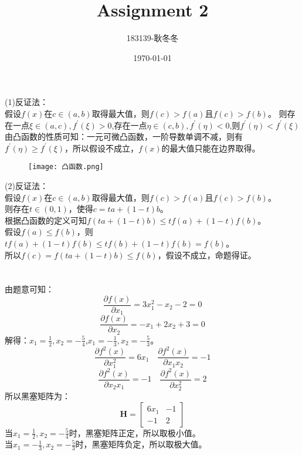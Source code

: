 \documentclass[12pt]{article}
\begin{document}
\title{Assignment 2}
\author{183139-耿冬冬}
\date{\today}
\maketitle

\section{}
\noindent
(1)反证法：\\
假设$f(x)$在$c \in (a,b)$取得最大值，则$f(c)>f(a)$且$f(c)>f(b)$。
则存在一点$\xi \in(a,c),f^{'}(\xi)>0$,存在一点$\eta \in(c,b),f^{'}(\eta)<0$,则$f^{'}(\eta) < f^{'}(\xi)$\\
由凸函数的性质可知：一元可微凸函数，一阶导数单调不减，则有$f^{'}(\eta) \geq f^{'}(\xi)$，所以假设不成立，$f(x)$的最大值只能在边界取得。\\
\begin{figure}
    \centering
    \texttt{[image: 凸函数.png]}
\end{figure}
(2)反证法：\\
假设$f(x)$在$c \in (a,b)$取得最大值，则$f(c)>f(a)$且$f(c)>f(b)$。\\
则存在$t \in(0,1)$，使得$c=ta+(1-t)b$。\\根据凸函数的定义可知$f(ta+(1-t)b)\leq tf(a)+(1-t)f(b)$。\\假设$f(a)\leq f(b)$，则$tf(a)+(1-t)f(b)\leq tf(b)+(1-t)f(b)=f(b)$。\\
所以$f(c)=f(ta+(1-t)b)\leq f(b)$，假设不成立，命题得证。
\section{}
\noindent
由题意可知：\\
\[\frac{\partial f(x)}{\partial x_1}=3x_1^2-x_2-2=0\] 
\[\frac{\partial f(x)}{\partial x_2}=-x_1+2x_2+3=0\] 
解得：$x_1=\frac{1}{2},x_2=-\frac{5}{4}$,\quad $x_1=-\frac{1}{3},x_2=-\frac{5}{3}$。
\[\frac{\partial f^2(x)}{\partial x_1^2}=6x_1 \quad \frac{\partial f^2(x)}{\partial x_1x_2}=-1\]
\[\frac{\partial f^2(x)}{\partial x_2x_1}=-1 \quad \frac{\partial f^2(x)}{\partial x^2_2}=2\]
所以黑塞矩阵为：\\
\[\boldsymbol{H}=\begin{bmatrix}
    6x_1 & -1 \\
    -1 & 2 
\end{bmatrix}
\]
当$x_1=\frac{1}{2},x_2=-\frac{5}{4}$时，黑塞矩阵正定，所以取极小值。\\
当$x_1=-\frac{1}{3},x_2=-\frac{5}{3}$时，黑塞矩阵负定，所以取极大值。
\end{document}
